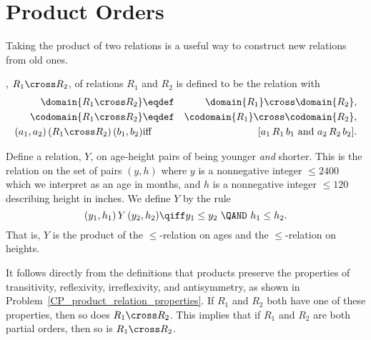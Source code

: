 \begin{definition}
\begin{problems}
\practiceproblems
{}

\classproblems
{}

\homeworkproblems
{}

\examproblems
{}

\end{problems}


\section{Product Orders}\label{prodsec}

Taking the product of two relations is a useful way to construct new
relations from old ones.

\begin{definition}\label{productrel}
, $R_1 \cross R_2$, of relations
$R_1$ and $R_2$ is defined to be the relation with
\begin{eqnarray*}
\domain{R_1 \cross R_2} &\eqdef& \domain{R_1} \cross \domain{R_2},\\
\codomain{R_1 \cross R_2} &\eqdef& \codomain{R_1} \cross \codomain{R_2},\\
(a_1,a_2)\, (R_1 \cross R_2)\, (b_1,b_2) &\text{iff}& [a_1\, R_1\, b_1
\text{ and } a_2\, R_2\, b_2].
\end{eqnarray*}

\end{definition}

\begin{example}\label{Y}
Define a relation, $Y$, on age-height pairs of being younger \emph{and}
shorter.  This is the relation on the set of pairs $(y,h)$ where $y$ is a
nonnegative integer $\le 2400$ which we interpret as an age in months, and $h$
is a nonnegative integer $\le 120$ describing height in inches.  We define $Y$
by the rule
\[
(y_1,h_1)\, Y\, (y_2,h_2) \qiff y_1 \le y_2\ \QAND\ h_1 \le h_2.
\]
That is, $Y$ is the product of the $\le$-relation on ages and the
$\le$-relation on heights.
\end{example}

It follows directly from the definitions that products preserve the
properties of transitivity, reflexivity, irreflexivity, and
antisymmetry, as shown in
Problem~\ref{CP_product_relation_properties}.  If $R_1$ and
$R_2$ both have one of these properties, then so does $R_1 \cross
R_2$.  This implies that if $R_1$ and $R_2$ are both partial orders,
then so is $R_1 \cross R_2$.


\end{definition}
